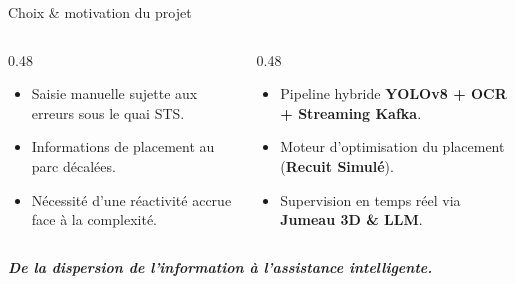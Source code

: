 \documentclass[aspectratio=169,french]{beamer}
\begin{document}
\begin{frame}{Choix \& motivation du projet}
  \begin{columns}[t]
    \begin{column}{0.48\textwidth}
      \begin{tcolorbox}[cardstyle,title=\small\bfseries La motivation]
        \small
        \begin{itemize}
          \item Saisie manuelle sujette aux erreurs sous le quai STS.
          \item Informations de placement au parc décalées.
          \item Nécessité d'une réactivité accrue face à la complexité.
        \end{itemize}
      \end{tcolorbox}
    \end{column}
    
    \begin{column}{0.48\textwidth}
      \begin{tcolorbox}[cardstyle,title=\small\bfseries Le choix retenu]
        \small
        \begin{itemize}
          \item Pipeline hybride \textbf{YOLOv8 + OCR + Streaming Kafka}.
          \item Moteur d'optimisation du placement (\textbf{Recuit Simulé}).
          \item Supervision en temps réel via \textbf{Jumeau 3D \& LLM}.
        \end{itemize}
      \end{tcolorbox}
    \end{column}
  \end{columns}
  
  \vspace{0.4cm}
  \begin{center}
    \small\bfseries\itshape\textcolor{RefBlue}{De la dispersion de l'information à l'\textcolor{RefOrange}{assistance intelligente}.}
  \end{center}
\end{frame}
\end{document}

